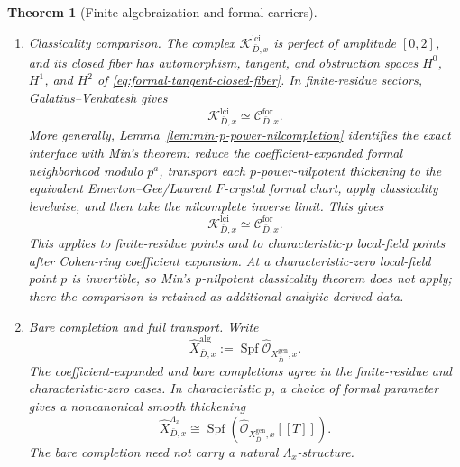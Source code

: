 \documentclass[11pt]{article}
\newtheorem{theorem}{Theorem}[section]
\theoremstyle{definition}
\begin{document}
\begin{theorem}[Finite algebraization and formal carriers]
\begin{enumerate}[label=\textnormal{(\roman*)}]
\item \emph{Classicality comparison.}
The complex $\mathcal K^{\mathrm{lci}}_{\bar D,x}$ is perfect of amplitude $[0,2]$, and its closed fiber has automorphism, tangent, and obstruction spaces $H^0$, $H^1$, and $H^2$ of \eqref{eq:formal-tangent-closed-fiber}.  In finite-residue sectors, Galatius--Venkatesh gives
\begin{equation}\label{eq:residual-derived-discrete-comparison}
\mathcal K^{\mathrm{lci}}_{\bar D,x}
\simeq\mathcal C^{\mathrm{for}}_{\bar D,x}.
\end{equation}
More generally, Lemma~\ref{lem:min-p-power-nilcompletion} identifies the exact interface with Min's theorem: reduce the coefficient-expanded formal neighborhood modulo $p^a$, transport each $p$-power-nilpotent thickening to the equivalent Emerton--Gee/Laurent $F$-crystal formal chart, apply classicality levelwise, and then take the nilcomplete inverse limit.  This gives
\begin{equation}\label{eq:p-nilpotent-derived-classicality-comparison}
\mathcal K^{\mathrm{lci}}_{\bar D,x}
\simeq\mathcal C^{\mathrm{for}}_{\bar D,x}.
\end{equation}
This applies to finite-residue points and to characteristic-$p$ local-field points after Cohen-ring coefficient expansion.  At a characteristic-zero local-field point $p$ is invertible, so Min's $p$-nilpotent classicality theorem does not apply; there the comparison is retained as additional analytic derived data.

\item \emph{Bare completion and full transport.}
Write
\[
\widehat X^{\mathrm{alg}}_{\bar D,x}
:=\operatorname{Spf}\widehat{\mathcal O}_{X_{\bar D}^{\mathrm{gen}},x}.
\]
The coefficient-expanded and bare completions agree in the finite-residue and characteristic-zero cases.  In characteristic $p$, a choice of formal parameter gives a noncanonical smooth thickening
\begin{equation}\label{eq:charp-coefficient-thickening}
\widehat X^{\Lambda_x}_{\bar D,x}
\cong
\operatorname{Spf}\!\left(
\widehat{\mathcal O}_{X_{\bar D}^{\mathrm{gen}},x}[[T]]
\right).
\end{equation}
The bare completion need not carry a natural $\Lambda_x$-structure.


\end{enumerate}
\end{theorem}
\end{document}
